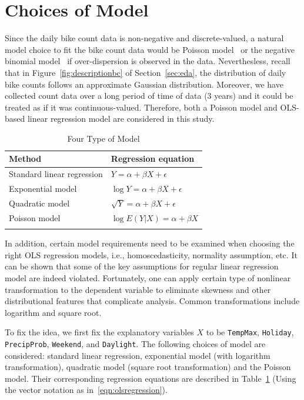 \documentclass [11pt, proquest] {uwthesis}[2015/03/03]
\begin{document}
\section{Choices of Model}
\label{sec:choiceofmodel}

Since the daily bike count data is non-negative and discrete-valued, a natural model choice to fit the bike count data would be Poisson model~\cite{Niemeier:1996aa} or the negative binomial model~\cite{PeterWeiran16} if over-dispersion is observed in the data. Neverthesless, recall that in Figure~\ref{fig:descriptionbc} of Section~\ref{sec:eda}, the distribution of daily bike counts follows an approximate Gaussian distribution. Moreover, we have collected count data over a long period of time of data (3 years) and it could be treated as if it was continuous-valued. Therefore, both a Poisson model and OLS-based linear regression model are considered in this study.

\begin{table}
\begin{center}
\caption{Four Type of Model}
\vspace{10pt}
\begin{tabular}{l|l} 
 \hline
Method & Regression equation \\
\hline
Standard linear regression & $Y=\alpha+\beta X + \epsilon$ \\
Exponential model & $\log{Y} = \alpha + \beta X + \epsilon$ \\
Quadratic model & $\sqrt{Y} = \alpha + \beta X + \epsilon$ \\
Poisson model & $\log{E(Y|X)} = \alpha + \beta X $\\
\label{tbl:choiceofmodel}
\end{tabular}
\end{center}
\end{table}

In addition, certain model requirements need to be examined when choosing the right OLS regression models, i.e., homoscedasticity, normality assumption, etc. It can be shown that some of the key assumptions for regular linear regression model are indeed violated. Fortunately, one can apply certain type of nonlinear transformation to the dependent variable to eliminate skewness and other distributional features that complicate analysis. Common transformations include logarithm and square root.

To fix the idea, we first fix the explanatory variables $X$ to be \texttt{TempMax}, \texttt{Holiday}, \texttt{PrecipProb}, \texttt{Weekend}, and \texttt{Daylight}. The following choices of model are considered: standard linear regression, exponential model (with logarithm transformation), quadratic model (square root transformation) and the Poisson model. Their corresponding regression equations are described in Table~\ref{tbl:choiceofmodel} (Using the vector notation as in~\eqref{eqn:olsregression}).
\end{document}
